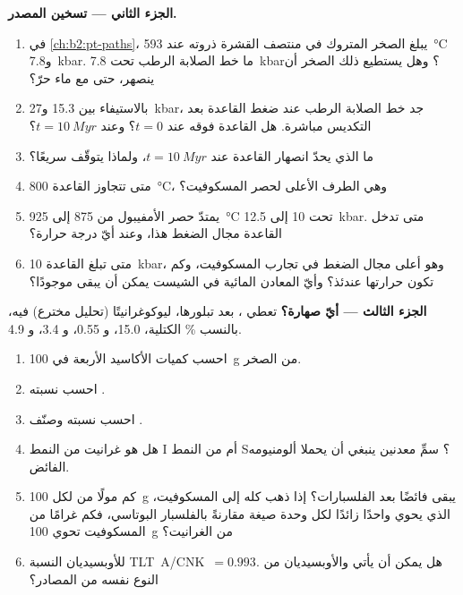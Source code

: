 \begin{problem}
\noindent\textbf{الجزء الثاني --- تسخين المصدر.}
\begin{enumerate}[resume]
\item في \cref{ch:b2:pt-paths}، يبلغ الصخر المتروك في منتصف القشرة ذروته عند \qty{593}{\celsius}
و\qty{7.8}{kbar}. ما خط الصلابة الرطب تحت \qty{7.8}{kbar}؟ وهل يستطيع ذلك الصخر أن ينصهر، حتى
مع ماء حرّ؟
\item بالاستيفاء بين 15.3 و\qty{27}{kbar}، جد خط الصلابة الرطب عند ضغط
القاعدة بعد التكديس مباشرة. هل القاعدة فوقه عند $t = 0$؟ وعند $t = \qty{10}{Myr}$؟
\item ما الذي يحدّ انصهار القاعدة عند $t = \qty{10}{Myr}$، ولماذا يتوقّف
سريعًا؟
\item متى تتجاوز القاعدة \qty{800}{\celsius}، وهي الطرف الأعلى لحصر
المسكوفيت؟
\item يمتدّ حصر الأمفيبول من 875 إلى \qty{925}{\celsius} تحت 10 إلى \qty{12.5}{kbar}.
متى تدخل القاعدة مجال الضغط هذا، وعند أيّ درجة حرارة؟
\item متى تبلغ القاعدة \qty{10}{kbar}، وهو أعلى مجال الضغط في
تجارب المسكوفيت، وكم تكون حرارتها عندئذ؟ وأيّ المعادن المائية في الشيست يمكن أن
يبقى موجودًا؟
\end{enumerate}

\noindent\textbf{الجزء الثالث --- أيّ صهارة؟}
تعطي ، بعد تبلورها، ليوكوغرانيتًا (تحليل مخترع) فيه، بالنسب
\unit{\percent} الكتلية،  15.0، و 0.55، و 3.4، و 4.9.
\begin{enumerate}[resume]
\item احسب كميات الأكاسيد الأربعة في \qty{100}{\gram} من الصخر.
\item احسب نسبته .
\item احسب نسبته  وصنّف .
\item هل هو غرانيت من النمط I أم من النمط S؟ سمِّ معدنين ينبغي أن يحملا ألومنيومه
الفائض.
\item كم مولًا من  لكل \qty{100}{\gram} يبقى فائضًا بعد
الفلسبارات؟ إذا ذهب كله إلى المسكوفيت، الذي يحوي  واحدًا زائدًا لكل وحدة
صيغة مقارنةً بالفلسبار البوتاسي، فكم غرامًا من المسكوفيت تحوي \qty{100}{\gram} من الغرانيت؟
\item للأوبسيديان  النسبة \mbox{\textdir TLT A/CNK $= 0.993$}. هل يمكن أن يأتي  والأوبسيديان
من النوع نفسه من المصادر؟
\end{enumerate}


\end{problem}
